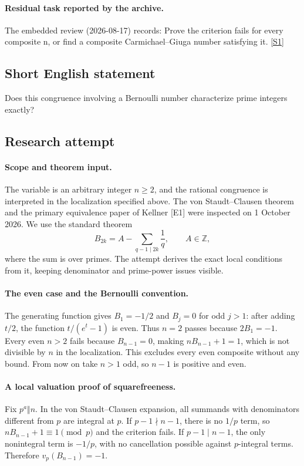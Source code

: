 \documentclass[11pt,a4paper]{article}
\newcommand{\sref}[2]{\hyperlink{source:#1:#2}{[S#2]}}
\begin{document}
\paragraph{Residual task reported by the archive.}

The embedded review (2026-08-17) records: Prove the criterion fails for every composite n, or find a composite Carmichael--Giuga number satisfying it. \sref{1295}{1}

\subsection{Short English statement}

Does this congruence involving a Bernoulli number characterize prime integers exactly?

\subsection{Research attempt}

\paragraph{Scope and theorem input.}
The variable is an arbitrary integer $n\ge2$, and the rational
congruence is interpreted in the localization specified above. The
von Staudt--Clausen theorem and the primary equivalence paper of Kellner
[E1] were inspected on 1 October 2026. We use the standard theorem
\[
 B_{2k}=A-\sum_{q-1\mid2k}\frac1q,\qquad A\in\mathbb Z,
\]
where the sum is over primes. The attempt derives the exact local
conditions from it, keeping denominator and prime-power issues visible.

\paragraph{The even case and the Bernoulli convention.}
The generating function gives $B_1=-1/2$ and $B_j=0$ for odd
$j>1$: after adding $t/2$, the function $t/(e^t-1)$ is even.
Thus $n=2$ passes because $2B_1=-1$. Every even $n>2$ fails because
$B_{n-1}=0$, making $nB_{n-1}+1=1$, which is not divisible by $n$
in the localization. This excludes every even composite without any
bound. From now on take $n>1$ odd, so $n-1$ is positive and even.

\paragraph{A local valuation proof of squarefreeness.}
Fix $p^a\Vert n$. In the von Staudt--Clausen expansion, all summands
with denominators different from $p$ are integral at $p$. If
$p-1\nmid n-1$, there is no $1/p$ term, so $nB_{n-1}+1\equiv1\pmod p$
and the criterion fails. If $p-1\mid n-1$, the only nonintegral
term is $-1/p$, with no cancellation possible against $p$-integral
terms. Therefore $v_p(B_{n-1})=-1$.
\end{document}
